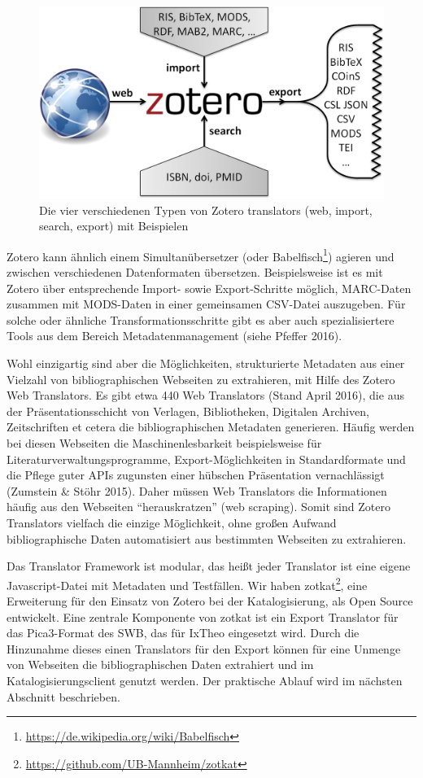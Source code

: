 \documentclass[a4paper,
fontsize=11pt,
oneside,
numbers=noperiodatend,
parskip=half-,
bibliography=totoc,
final
]{scrartcl}
\begin{document}
\begin{figure}[htbp]
\centering
\includegraphics{img/Zotero-Translators.jpg}
\caption{Die vier verschiedenen Typen von Zotero translators (web,
im\-port, search, export) mit Beispielen}
\end{figure}

Zotero kann ähnlich einem Simultanübersetzer (oder Babelfisch\footnote{\url{https://de.wikipedia.org/wiki/Babelfisch}})
agieren und zwischen verschiedenen Datenformaten übersetzen.
Beispielsweise ist es mit Zotero über entsprechende Im\-port- sowie
Export-Schritte möglich, MARC-Daten zusammen mit MODS-Daten in einer
gemeinsamen CSV-Datei auszugeben. Für solche oder ähnliche
Transformationsschritte gibt es aber auch spezialisiertere Tools aus dem
Bereich Metadatenmanagement (siehe Pfeffer 2016).

Wohl einzigartig sind aber die Möglichkeiten, strukturierte Metadaten
aus einer Vielzahl von bibliographischen Webseiten zu extrahieren, mit
Hilfe des Zotero Web Translators. Es gibt etwa 440 Web Translators
(Stand April 2016), die aus der Präsentationsschicht von Verlagen,
Bibliotheken, Digitalen Archiven, Zeitschriften et cetera die
bibliographischen Metadaten generieren. Häufig werden bei diesen
Webseiten die Maschinenlesbarkeit beispielsweise für
Literaturverwaltungsprogramme, Export-Möglichkeiten in Standardformate
und die Pflege guter APIs zugunsten einer hübschen Präsentation
vernachlässigt (Zumstein \& Stöhr 2015). Daher müssen Web Translators
die Informationen häufig aus den Webseiten \enquote{herauskratzen} (web
scraping). Somit sind Zotero Translators vielfach die einzige
Möglichkeit, ohne großen Aufwand bibliographische Daten automatisiert
aus bestimmten Webseiten zu extrahieren.

Das Translator Framework ist modular, das heißt jeder Translator ist
eine eigene Javascript-Datei mit Metadaten und Testfällen. Wir haben
zotkat\footnote{\url{https://github.com/UB-Mannheim/zotkat}}, eine
Erweiterung für den Einsatz von Zotero bei der Katalogisierung, als Open
Source entwickelt. Eine zentrale Komponente von zotkat ist ein Export
Translator für das Pica3-Format des SWB, das für IxTheo eingesetzt wird.
Durch die Hinzunahme dieses einen Translators für den Export können für
eine Unmenge von Webseiten die bibliographischen Daten extrahiert und im
Katalogisierungsclient genutzt werden. Der praktische Ablauf wird im
nächsten Abschnitt beschrieben.
\end{document}
